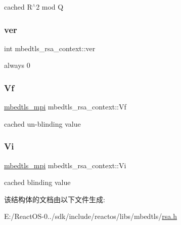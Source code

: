cached R$^\wedge$2 mod Q \mbox{\label{structmbedtls__rsa__context_a3b8683697a6f69c92860e078c934a4d9}} 
\subsubsection{\texorpdfstring{ver}{ver}}
{\footnotesize\ttfamily int mbedtls\+\_\+rsa\+\_\+context\+::ver}

always 0 \mbox{\label{structmbedtls__rsa__context_a5537a6306b03dbd02ba435738d660333}} 
\subsubsection{\texorpdfstring{Vf}{Vf}}
{\footnotesize\ttfamily \hyperlink{structmbedtls__mpi}{mbedtls\+\_\+mpi} mbedtls\+\_\+rsa\+\_\+context\+::\+Vf}

cached un-\/blinding value \mbox{\label{structmbedtls__rsa__context_ae042ea2b11c2934694dbacb3656331ca}} 
\subsubsection{\texorpdfstring{Vi}{Vi}}
{\footnotesize\ttfamily \hyperlink{structmbedtls__mpi}{mbedtls\+\_\+mpi} mbedtls\+\_\+rsa\+\_\+context\+::\+Vi}

cached blinding value 

该结构体的文档由以下文件生成\+:\begin{DoxyCompactItemize}
\item 
E\+:/\+React\+O\+S-\/0../sdk/include/reactos/libs/mbedtls/\hyperlink{rsa_8h}{rsa.\+h}\end{DoxyCompactItemize}
